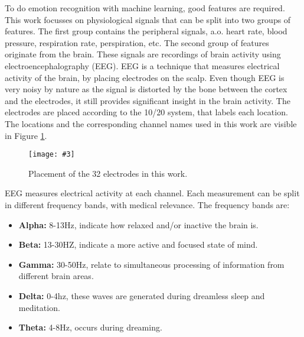 \documentclass[12pt,journal,compsoc]{IEEEtran}
\newcommand{\npar}{\par \vspace{2.3ex plus 0.3ex minus 0.3ex}}
\newcommand{\mijnfiguur}[4][H]{            %
    \begin{figure}[#1]                      %
        \begin{center}                      %
            \texttt{[image: \#3]}        %
            \caption{#4\label{#3}}          %
        \end{center}
    \end{figure}
    }
\begin{document}
\npar

To do emotion recognition with machine learning, good features are required. This work focusses on physiological signals that can be split into two groups of features. The first group contains the peripheral signals, a.o. heart rate, blood pressure, respiration rate, perspiration, etc. The second group of features originate from the brain. These signals are recordings of brain activity using electroencephalography (EEG). EEG is a technique that measures electrical activity of the brain, by placing electrodes on the scalp\cite{ExtendedPaper}. Even though EEG is very noisy by nature as the signal is distorted by the bone between the cortex and the electrodes, it still provides significant insight in the brain activity\cite{GivenPaper}. The electrodes are placed according to the 10/20 system, that labels each location. The locations and the corresponding channel names used in this work are visible in Figure \ref{1020labels}.

\mijnfiguur{width=0.5\textwidth}{1020labels}{Placement of the 32 electrodes in this work.\cite{1020Site}}

EEG measures electrical activity at each channel. Each measurement can be split in different frequency bands, with medical relevance\cite{EmotionRelativePower,WavesSite}. The frequency bands are:
\begin{itemize}
\item \textbf{Alpha:} 8-13Hz, indicate how relaxed and/or inactive the brain is.
\item \textbf{Beta:} 13-30HZ, indicate a more active and focused state of mind.
\item \textbf{Gamma:} 30-50Hz, relate to simultaneous processing of information from different brain areas.
\item \textbf{Delta:} 0-4hz, these waves are generated during dreamless sleep and meditation.
\item \textbf{Theta:} 4-8Hz, occurs during dreaming.
\end{itemize}

\end{document}
